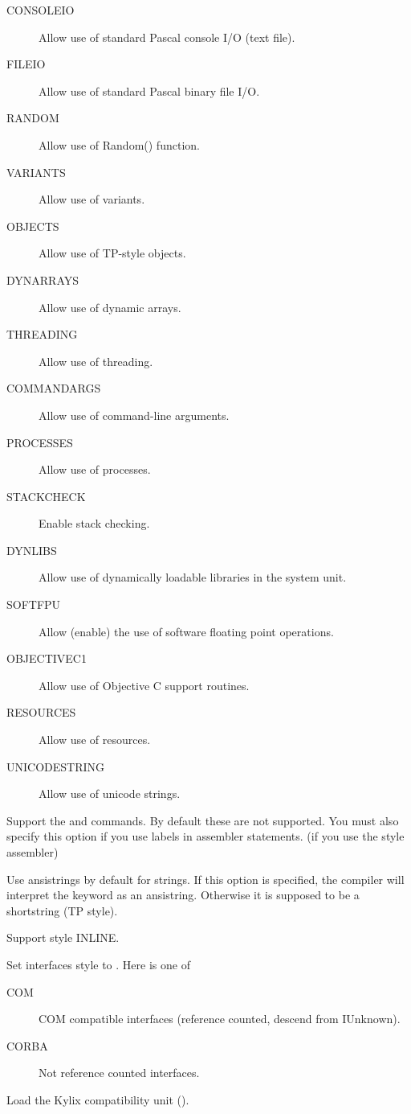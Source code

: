 \begin{description}
\begin{description}
\item[CONSOLEIO] Allow use of standard  Pascal console I/O (text file).
\item[FILEIO] Allow use of standard  Pascal binary file I/O.
\item[RANDOM] Allow use of Random() function.
\item[VARIANTS] Allow use of variants.
\item[OBJECTS] Allow use of TP-style objects.
\item[DYNARRAYS] Allow use of dynamic arrays.
\item[THREADING] Allow use of threading.
\item[COMMANDARGS] Allow use of command-line arguments.
\item[PROCESSES] Allow use of processes.
\item[STACKCHECK] Enable stack checking.
\item[DYNLIBS] Allow use of dynamically loadable libraries in the system unit.
\item[SOFTFPU] Allow (enable) the use of software floating point operations.
\item[OBJECTIVEC1] Allow use of Objective C support routines.
\item[RESOURCES] Allow use of resources.
\item[UNICODESTRING] Allow use of unicode strings.
\end{description}
\item [-Sg]  Support the  and  commands. By
default these are not supported. You must also specify this option if you
use labels in assembler statements. (if you use the  style
assembler)
\item [-Sh] Use ansistrings by default for strings. If this option is
specified, the compiler will interpret the  keyword as an
ansistring. Otherwise it is supposed to be a shortstring (TP style).
\item [-Si]  Support  style INLINE.
\item [-SIXXX] Set interfaces style to  . Here  is one of
\begin{description}
\item[COM] COM compatible interfaces (reference counted, descend from IUnknown).
\item[CORBA] Not reference counted interfaces.
\end{description}
\item [-Sk] Load the Kylix compatibility unit ().

\end{description}
